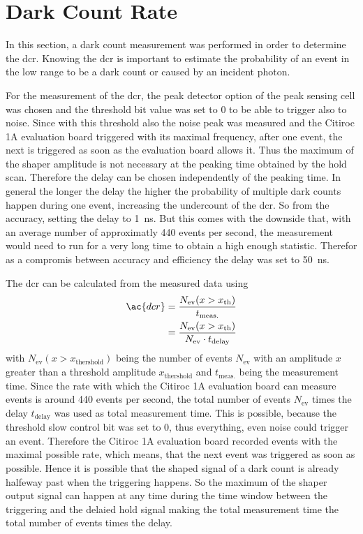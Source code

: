 \FloatBarrier
\section{Dark Count Rate}
In this section, a dark count measurement was performed in order to determine the \ac{dcr}. 
Knowing the \ac{dcr} is important to estimate the probability of an event in the low \si{\pe} range to be a dark count or caused by an incident photon.

For the measurement of the \ac{dcr}, the peak detector option of the peak sensing cell was chosen and the threshold bit value was set to 0 to be able to trigger also to noise.
Since with this threshold also the noise peak was measured and the Citiroc 1A evaluation board triggered with its maximal frequency, after one event, the next is triggered as soon as the evaluation board allows it.
Thus the maximum of the shaper amplitude is not necessary at the peaking time obtained by the hold scan. 
Therefore the delay can be chosen independently of the peaking time.
In general the longer the delay the higher the probability of multiple dark counts happen during one event, increasing the undercount of the \ac{dcr}.
So from the accuracy, setting the delay to \SI{1}{\nano\second}.
But this comes with the downside that, with an average number of approximatly 440 events per second, the measurement would need to run for a very long time to obtain a high enough statistic.
Therefor as a compromis between accuracy and efficiency the delay was set to \SI{50}{\nano\second}.


The \ac{dcr} can be calculated from the measured data using
\begin{align}
	\ac{dcr} &= \frac{N_\text{ev}(x>x_\text{th})}{t_\text{meas.}}\\
	&= \frac{N_\text{ev}(x>x_\text{th})}{N_\text{ev}\cdot t_\text{delay}}
\end{align}
with $N_\text{ev}(x>x_\text{thershold})$ being the number of events $N_\text{ev}$ with an amplitude $x$ greater than a threshold amplitude $x_\text{thershold}$ and $t_\text{meas.}$ being the measurement time.
Since the rate with which the Citiroc 1A evaluation board can measure events is around 440 events per second, the total number of events $N_\text{ev}$ times the delay $t_\text{delay}$ was used as total measurement time. 
This is possible, because the threshold slow control bit was set to 0, thus everything, even noise could trigger an event. 
Therefore the Citiroc 1A evaluation board recorded events with the maximal possible rate, which means, that the next event was triggered as soon as possible. 
Hence it is possible that the shaped signal of a dark count is already halfeway past when the triggering happens.
So the maximum of the shaper output signal can happen at any time during the time window between the triggering and the delaied hold signal making the total measurement time the total number of events times the delay.

